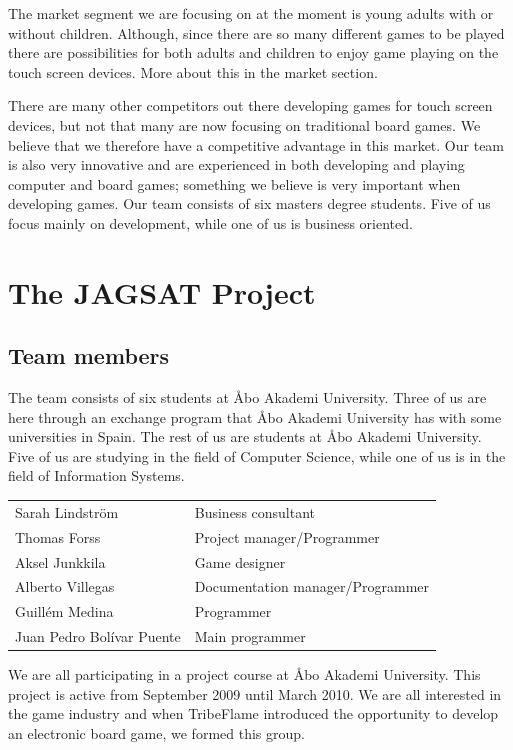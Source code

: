 \documentclass[12pt,a4paper]{article}
\begin{document}
The market segment we are focusing on at the moment is young adults with or without children. Although, since there are so many different games to be played there are possibilities for both adults and children to enjoy game playing on the touch screen devices. More about this in the market section.

There are many other competitors out there developing games for touch screen devices, but not that many are now focusing on traditional board games. We believe that we therefore have a competitive advantage in this market.  Our team is also very innovative and are experienced in both developing and playing computer and board games; something we believe is very important when developing games. Our team consists of six masters degree students. Five of us focus mainly on development, while one of us is business oriented.

\section {The JAGSAT Project}
\subsection{Team members}
The team consists of six students at Åbo Akademi University. Three of us are here through an exchange program that Åbo Akademi University has with some universities in Spain. The rest of us are students at Åbo Akademi University. Five of us are studying in the field of Computer Science, while one of us is in the field of Information Systems.

\begin{tabular}{ | l | l | }\hline
Sarah Lindstr\"om			&Business consultant\\
Thomas Forss				&Project manager/Programmer\\
Aksel Junkkila				&Game designer\\
Alberto Villegas			&Documentation manager/Programmer\\
Guill\'em Medina			&Programmer\\
Juan Pedro Bol\'ivar Puente	&Main programmer\\\hline
\end{tabular}

We are all participating in a project course at Åbo Akademi University. This project is active from September 2009 until March 2010. We are all interested in the game industry and when TribeFlame introduced the opportunity to develop an electronic board game, we formed this group.
\end{document}
